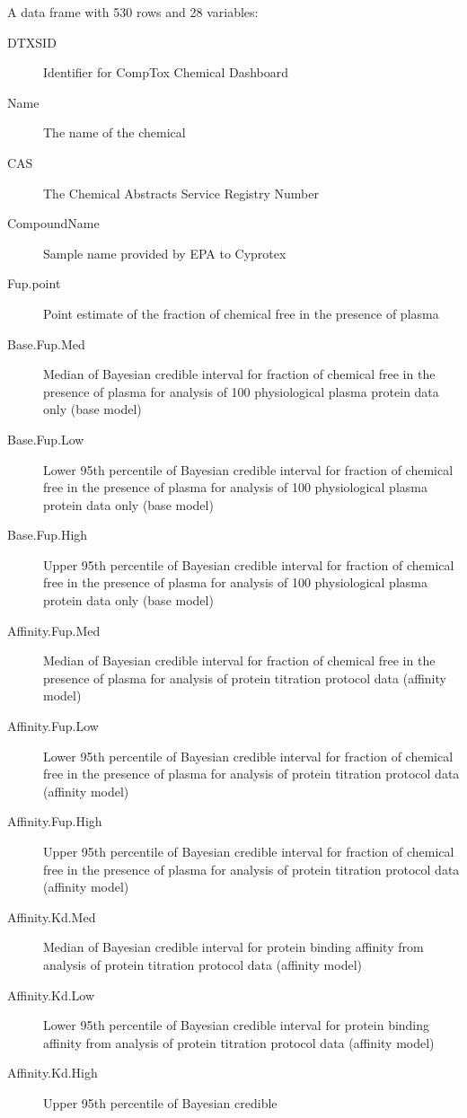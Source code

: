 \documentclass[a4paper]{book}
\begin{document}
\begin{Format}
A data frame with 530 rows and 28 variables:
\begin{description}

\item[DTXSID] Identifier for CompTox Chemical Dashboard
\item[Name] The name of the chemical
\item[CAS] The Chemical Abstracts Service Registry Number
\item[CompoundName] Sample name provided by EPA to Cyprotex
\item[Fup.point] Point estimate of the fraction of
chemical free in the presence of plasma
\item[Base.Fup.Med] Median of Bayesian credible interval for
fraction of chemical free in the presence of plasma for analysis of 100
physiological plasma protein data only (base model)
\item[Base.Fup.Low] Lower 95th percentile of Bayesian credible
interval for fraction of chemical free in the presence of plasma for analysis of 100
physiological plasma protein data only (base model)
\item[Base.Fup.High] Upper 95th percentile of Bayesian credible
interval for fraction of chemical free in the presence of plasma for analysis of 100
physiological plasma protein data only (base model)
\item[Affinity.Fup.Med] Median of Bayesian credible interval for
fraction of chemical free in the presence of plasma for analysis of protein
titration protocol data (affinity model)
\item[Affinity.Fup.Low] Lower 95th percentile of Bayesian credible
interval for fraction of chemical free in the presence of plasma for analysis of protein
titration protocol data (affinity model)
\item[Affinity.Fup.High] Upper 95th percentile of Bayesian credible
interval for fraction of chemical free in the presence of plasma for analysis of protein
titration protocol data (affinity model)
\item[Affinity.Kd.Med] Median of Bayesian credible interval for
protein binding affinity from analysis of protein
titration protocol data (affinity model)
\item[Affinity.Kd.Low] Lower 95th percentile of Bayesian credible
interval for protein binding affinity from analysis of protein
titration protocol data (affinity model)
\item[Affinity.Kd.High] Upper 95th percentile of Bayesian credible

\end{description}
\end{Format}
\end{document}
